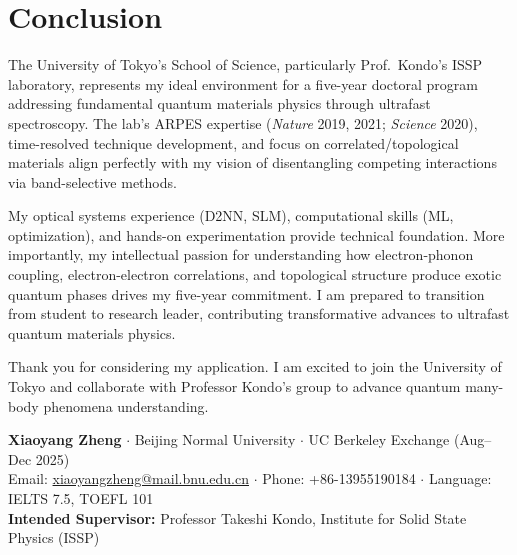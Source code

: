 \documentclass[11pt,a4paper]{article}
\begin{document}
\section{Conclusion}

The University of Tokyo's School of Science, particularly Prof.~Kondo's ISSP laboratory, represents my ideal environment for a five-year doctoral program addressing fundamental quantum materials physics through ultrafast spectroscopy. The lab's ARPES expertise (\textit{Nature} 2019, 2021; \textit{Science} 2020), time-resolved technique development, and focus on correlated/topological materials align perfectly with my vision of disentangling competing interactions via band-selective methods.

My optical systems experience (D2NN, SLM), computational skills (ML, optimization), and hands-on experimentation provide technical foundation. More importantly, my intellectual passion for understanding how electron-phonon coupling, electron-electron correlations, and topological structure produce exotic quantum phases drives my five-year commitment. I am prepared to transition from student to research leader, contributing transformative advances to ultrafast quantum materials physics.

Thank you for considering my application. I am excited to join the University of Tokyo and collaborate with Professor Kondo's group to advance quantum many-body phenomena understanding.

\vspace{5em}

\noindent
\textbf{Xiaoyang Zheng} $\cdot$ Beijing Normal University $\cdot$ UC Berkeley Exchange (Aug--Dec 2025)\\
Email: \href{mailto:xiaoyangzheng@mail.bnu.edu.cn}{xiaoyangzheng@mail.bnu.edu.cn} $\cdot$ Phone: +86-13955190184 $\cdot$ Language: IELTS 7.5, TOEFL 101\\
\textbf{Intended Supervisor:} Professor Takeshi Kondo, Institute for Solid State Physics (ISSP)
\end{document}
